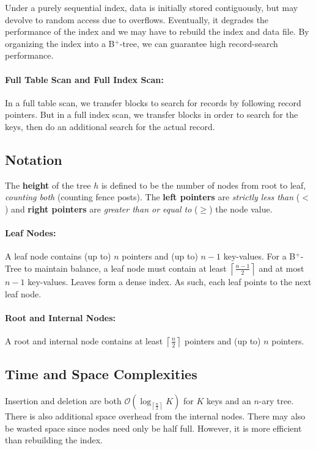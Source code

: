 \documentclass{report}
\renewcommand{\bf}[1]{\textbf{{#1}}}
\renewcommand{\it}[1]{\textit{{#1}}}
\begin{document}
Under a purely sequential index, data is initially stored contiguously, but may
devolve to random access due to overflows. Eventually, it degrades the
performance of the index and we may have to rebuild the index and data file. By
organizing the index into a B$^+$-tree, we can guarantee high record-search
performance.

\paragraph{Full Table Scan and Full Index Scan:} In a full table scan, we
transfer blocks to search for records by following record pointers. But in a
full index scan, we transfer blocks in order to search for the keys, then do an
additional search for the actual record.

\subsection{Notation}
The \bf{height} of the tree $h$ is defined to be the number of nodes from root to
leaf, \it{counting both} (counting fence posts). The \bf{left pointers} are
\it{strictly less than} ($<$) and \bf{right pointers} are
\it{greater than or equal to} ($\geq$) the node value.

\paragraph{Leaf Nodes:} A leaf node contains (up to) $n$ pointers and (up to) $n - 1$
key-values. For a B$^+$-Tree to maintain balance, a leaf node must contain at
least $\left\lceil\frac{n - 1}{2}\right\rceil$ and at most $n - 1$ key-values.
Leaves form a dense index. As such, each leaf points to the next leaf node.

\paragraph{Root and Internal Nodes:} A root and internal node contains at least
$\left\lceil\frac{n}{2}\right\rceil$ pointers and (up to) $n$ pointers.

\subsection{Time and Space Complexities}
Insertion and deletion are both
$\mathcal{O}\left(\log_{\left\lceil\frac{n}{2}\right\rceil} K\right)$ for $K$
keys and an $n$-ary tree. There is also additional space overhead from the
internal nodes. There may also be wasted space since nodes need only be half
full. However, it is more efficient than rebuilding the index.
\end{document}

